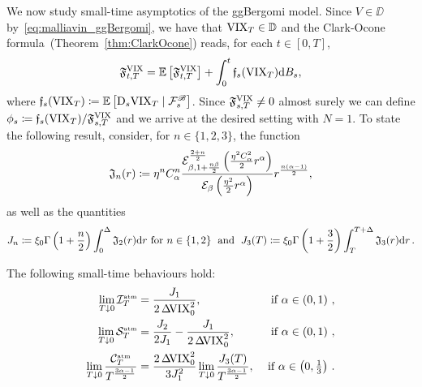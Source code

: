 We now study small-time asymptotics of the ggBergomi model. Since $V\in\DD$ by~\eqref{eq:malliavin_ggBergomi}, we have that $\mathrm{VIX}_T \in \mathbb{D}$ and the Clark-Ocone formula~(Theorem~\ref{thm:ClarkOcone}) %
reads, for each $t \in [0, T]$,
$$
\mathfrak{F}_{t,T}^{\mathrm{VIX}}=\mathbb{E}\left[\mathfrak{F}_{t,T}^{\mathrm{VIX}}\right] + \int_0^t \mathfrak{f}_{s}(\mathrm{VIX}_T) \mathrm{d} B_s,
$$
where $\mathfrak{f}_{s}(\mathrm{VIX}_T)\coloneqq \mathbb{E}\left[\mathrm{D}_s \mathrm{VIX}_T \mid \mathcal{F}^{\mathscr{B}}_s\right]$. Since $\mathfrak{F}_{s,T}^{\mathrm{VIX}} \neq 0$ almost surely we can define $\phi_s\coloneqq\mathfrak{f}_{s}(\mathrm{VIX}_T) / \mathfrak{F}_{s,T}^{\mathrm{VIX}}$ and we arrive at the desired setting with $N=1$. To state the following result, consider, 
for $n\in\{1,2,3\}$, the function
$$
\mathfrak{J}_{n}(r) \coloneqq \eta^n C_{\alpha}^n\frac{\mathcal{E}_{\beta,1+\frac{n\beta}{2}}^{\frac{2+n}{2}} \left(\frac{\eta^2 C_{\alpha}^2}{2}r^{\alpha}\right)}{\mathcal{E}_{\beta}\left(\frac{\eta^2}{2}r^{\alpha}\right)} r^{\frac{n(\alpha-1)}2},
$$
as well as the quantities
$$
J_n \coloneqq  \xi_0 \Gamma\left(1 + \frac{n}{2}\right) \int_0^\Delta \mathfrak{J}_{2}(r) \mathrm{d} r \textup{ for } n\in\{1,2\}\; \textup{ and } \;
J_3(T) \coloneqq \xi_0 \Gamma\left(1 + \frac{3}{2}\right) \int_T^{T+\Delta} \mathfrak{J}_{3}(r) \mathrm{d} r\,.
$$
\begin{proposition}\label{prop:ggBergomi_VIX_asym}
The following small-time behaviours hold:
\begin{equation}
\begin{aligned}
\lim _{T \downarrow 0} \mathcal{I}^{\textup{\tiny atm}}_T & =\frac{J_1}{2 \operatorname{\Delta\hspace{-0.6mm}\mathrm{VIX}}_0^2}, & \textup{ if } \alpha \in\left(0, 1\right)\,, \\
\lim _{T \downarrow 0} \mathcal{S}^{\textup{\tiny atm}}_T & =
\frac{J_2}{2J_1} - \frac{J_1}{2\operatorname{\Delta\hspace{-0.6mm}\mathrm{VIX}}_0^2}, & \textup{ if } \alpha \in\left(0, 1\right)\,, \\
\lim _{T \downarrow 0} \frac{\mathcal{C}^{\textup{\tiny atm}}_T}{T^{\frac{3\alpha-1}{2}}} &= \frac{2 \operatorname{\Delta\hspace{-0.6mm}\mathrm{VIX}}_0^2}{3J_1^2} \lim _{T \downarrow 0} \frac{J_3(T)}{T^{\frac{3\alpha-1}{2}}}, & \textup{ if } \textstyle\alpha \in\left(0, \frac{1}{3}\right)\,.
\end{aligned}
\end{equation}
\end{proposition}
